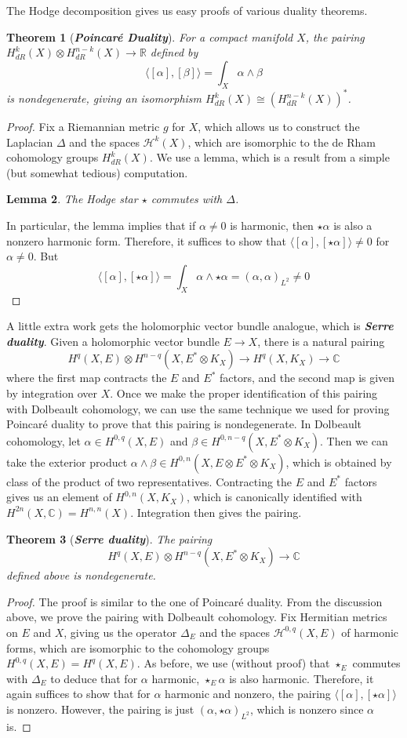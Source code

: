 \documentclass[psamsfonts, 12pt]{amsart}
\newtheorem{thm}{Theorem}[section]
\newtheorem{lem}[thm]{Lemma}
\theoremstyle{definition}
\theoremstyle{remark}
\newcommand{\R}{\mathbb{R}}
\newcommand{\ib}[1]{\textbf{\textit{#1}}}
\newcommand{\C}{\mathbb{C}}
\begin{document}
The Hodge decomposition gives us easy proofs of various duality theorems.
%
\begin{thm}[\ib{Poincar\'e Duality}]
For a compact manifold $X$, the pairing
$H^k_{dR}(X) \otimes H^{n-k}_{dR}(X) \to \R$ defined by
\[
\langle[\alpha],[\beta]\rangle = \int_X \alpha \wedge \beta
\]
is nondegenerate, giving an isomorphism $H^k_{dR}(X) \cong (H^{n-k}_{dR}(X))^*$.
\end{thm}
%
\begin{proof}
Fix a Riemannian metric $g$ for $X$, which allows us to construct the Laplacian
$\Delta$ and the spaces $\mathcal{H}^k(X)$, which are isomorphic to the de Rham
cohomology groups $H^k_{dR}(X)$. We use a lemma, which is a result from a simple
(but somewhat tedious) computation.
\begin{lem}
The Hodge star $\star$ commutes with $\Delta$.
\end{lem}
In particular, the lemma implies that if $\alpha \neq 0$ is harmonic, then $\star\alpha$
is also a nonzero harmonic form. Therefore, it suffices to show that
$\langle[\alpha],[\star\alpha]\rangle \neq 0$ for $\alpha \neq 0$. But
\[
\langle[\alpha],[\star\alpha]\rangle = \int_X \alpha\wedge\star\alpha
= (\alpha,\alpha)_{L^2} \neq 0
\]
\end{proof}
%
A little extra work gets the holomorphic vector bundle analogue, which is
\ib{Serre duality}. Given a holomorphic vector bundle $E \to X$, there is a natural
pairing
\[
H^{q}(X,E) \otimes H^{n-q}(X,E^* \otimes K_X) \to H^q(X, K_X) \to \C
\]
where the first map contracts the $E$ and $E^*$ factors, and the second map
is given by integration over $X$. Once we make the proper identification of this
pairing with Dolbeault cohomology, we can use the same technique we used for proving
Poincar\'e duality to prove that this pairing is nondegenerate. In Dolbeault cohomology,
let $\alpha \in H^{0,q}(X,E)$ and $\beta \in H^{0,n-q}(X,E^*\otimes K_X)$. Then
we can take the exterior product
$\alpha\wedge\beta \in H^{0,n}(X,E\otimes E^*\otimes K_X)$, which is obtained by
class of the product of two representatives. Contracting the $E$ and $E^*$ factors
gives us an element of $H^{0,n}(X,K_X)$, which is canonically identified with
$H^{2n}(X,\C) = H^{n,n}(X)$. Integration then gives the pairing.
%
\begin{thm}[\ib{Serre duality}]
The pairing
\[
H^{q}(X,E) \otimes H^{n-q}(X,E^* \otimes K_X) \to \C
\]
defined above is nondegenerate.
\end{thm}
%
\begin{proof}
The proof is similar to the one of Poincar\'e duality. From the discussion above, we
prove the pairing with Dolbeault cohomology. Fix Hermitian metrics on $E$ and $X$,
giving us the operator $\Delta_E$ and the spaces $\mathcal{H}^{0,q}(X,E)$ of harmonic
forms, which are isomorphic to the cohomology groups $H^{0,q}(X,E) = H^q(X,E)$. As
before, we use (without proof) that $\star_E$ commutes with $\Delta_E$ to deduce
that for $\alpha$ harmonic, $\star_E\alpha$ is also harmonic. Therefore, it again
suffices to show that for $\alpha$ harmonic and nonzero, the pairing
$\langle [\alpha],[\star\alpha]\rangle$ is nonzero. However, the pairing is just
$(\alpha,\star\alpha)_{L^2}$, which is nonzero since $\alpha$ is.
\end{proof}
%
\end{document}
